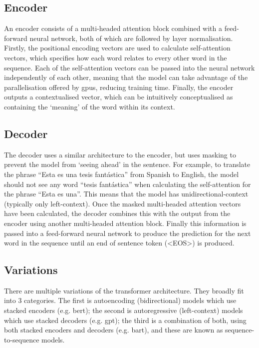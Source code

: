 \subsection{Encoder}
An encoder consists of a multi-headed attention block combined with a feed-forward neural network, both of which are followed by layer normalisation. Firstly, the positional encoding vectors are used to calculate self-attention vectors, which specifies how each word relates to every other word in the sequence. Each of the self-attention vectors can be passed into the neural network independently of each other, meaning that the model can take advantage of the parallelisation offered by \acrshort{gpu}s, reducing training time. Finally, the encoder outputs a contextualised vector, which can be intuitively conceptualised as containing the `meaning' of the word within its context.

\subsection{Decoder}
The decoder uses a similar architecture to the encoder, but uses masking to prevent the model from `seeing ahead' in the sentence. For example, to translate the phrase ``Esta es una tesis fantástica'' from Spanish to English, the model should not see any word ``tesis fantástica'' when calculating the self-attention for the phrase ``Esta es una''. This means that the model has unidirectional-context (typically only left-context). Once the masked multi-headed attention vectors have been calculated, the decoder combines this with the output from the encoder using another multi-headed attention block. Finally this information is passed into a feed-forward neural network to produce the prediction for the next word in the sequence until an end of sentence token (<EOS>) is produced.

\subsection{Variations}
There are multiple variations of the transformer architecture.
They broadly fit into 3 categories. The first is autoencoding (bidirectional) models which use stacked encoders (e.g. \acrshort{bert}); the second is autoregressive (left-context) models which use stacked decoders (e.g. \acrshort{gpt}); the third is a combination of both, using both stacked encoders and decoders (e.g. \acrshort{bart}), and these are known as sequence-to-sequence models. %

